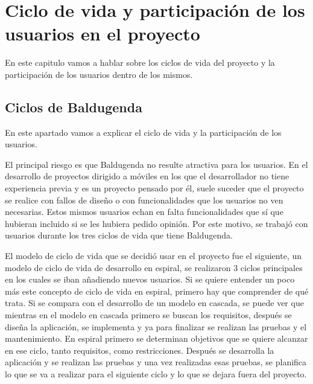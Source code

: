 \chapter{Ciclo de vida y participación de los usuarios en el proyecto}
\label{ch:ciclo de vida}



En este capitulo vamos a hablar sobre los ciclos de vida del proyecto y la participación de los usuarios dentro de los mismos.

\section{Ciclos de Baldugenda}
\label{secc:ciclos de Baldugenda}

En este apartado vamos a explicar el ciclo de vida y la participación de los usuarios. 

El principal riesgo es que Baldugenda no resulte atractiva para los usuarios. En el desarrollo de proyectos dirigido a móviles en los que el desarrollador no tiene experiencia previa y es un proyecto pensado por él, suele suceder que el proyecto se realice con fallos de diseño o con funcionalidades que los usuarios no ven necesarias. Estos mismos usuarios echan en falta funcionalidades que sí que hubieran incluido si se les hubiera pedido opinión. 
Por este motivo, se trabajó con usuarios durante los tres ciclos de vida que tiene Baldugenda.

El modelo de ciclo de vida que se decidió usar en el proyecto fue el siguiente, un modelo de ciclo de vida de desarrollo en espiral, se realizaron 3 ciclos principales en los cuales se iban añadiendo nuevos usuarios.
Si se quiere entender un poco más este concepto de ciclo de vida en espiral, primero hay que comprender de qué trata. Si se compara con el desarrollo de un modelo en cascada, se puede ver que mientras en el modelo en cascada primero se buscan los requisitos, después se diseña la aplicación, se implementa y ya para finalizar se realizan las pruebas y el mantenimiento. 
En espiral primero se determinan objetivos que se quiere alcanzar en ese ciclo, tanto requisitos, como restricciones. Después se desarrolla la aplicación y se realizan las pruebas y una vez realizadas esas pruebas, se planifica lo que se va a realizar para el siguiente ciclo y lo que se dejara fuera del proyecto. 

